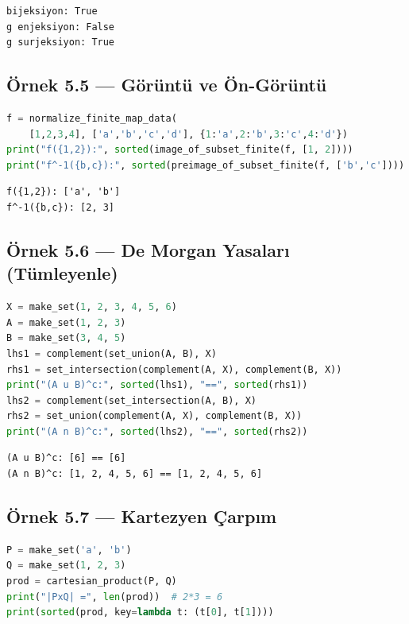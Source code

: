 \begin{verbatim}
bijeksiyon: True
g enjeksiyon: False
g surjeksiyon: True
\end{verbatim}

\subsection*{Örnek 5.5 — Görüntü ve Ön-Görüntü}

\begin{lstlisting}[language=Python]
f = normalize_finite_map_data(
    [1,2,3,4], ['a','b','c','d'], {1:'a',2:'b',3:'c',4:'d'})
print("f({1,2}):", sorted(image_of_subset_finite(f, [1, 2])))
print("f^-1({b,c}):", sorted(preimage_of_subset_finite(f, ['b','c'])))
\end{lstlisting}

\begin{verbatim}
f({1,2}): ['a', 'b']
f^-1({b,c}): [2, 3]
\end{verbatim}

\subsection*{Örnek 5.6 — De Morgan Yasaları (Tümleyenle)}

\begin{lstlisting}[language=Python]
X = make_set(1, 2, 3, 4, 5, 6)
A = make_set(1, 2, 3)
B = make_set(3, 4, 5)
lhs1 = complement(set_union(A, B), X)
rhs1 = set_intersection(complement(A, X), complement(B, X))
print("(A u B)^c:", sorted(lhs1), "==", sorted(rhs1))
lhs2 = complement(set_intersection(A, B), X)
rhs2 = set_union(complement(A, X), complement(B, X))
print("(A n B)^c:", sorted(lhs2), "==", sorted(rhs2))
\end{lstlisting}

\begin{verbatim}
(A u B)^c: [6] == [6]
(A n B)^c: [1, 2, 4, 5, 6] == [1, 2, 4, 5, 6]
\end{verbatim}

\subsection*{Örnek 5.7 — Kartezyen Çarpım}

\begin{lstlisting}[language=Python]
P = make_set('a', 'b')
Q = make_set(1, 2, 3)
prod = cartesian_product(P, Q)
print("|PxQ| =", len(prod))  # 2*3 = 6
print(sorted(prod, key=lambda t: (t[0], t[1])))
\end{lstlisting}

